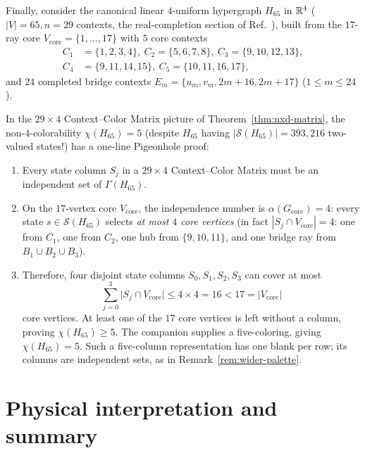 \documentclass[aps,pra,reprint,superscriptaddress,longbibliography,nofootinbib,floatfix,10pt]{revtex4-2}
\theoremstyle{definition}\newtheorem{definition}[theorem]{Definition}
\theoremstyle{remark}\newtheorem{remark}[theorem]{Remark}
\newcommand{\Sc}{\mathcal S}\newcommand{\Cc}{\mathcal C}
\begin{document}
Finally, consider the canonical linear $4$-uniform hypergraph $H_{65}$ in $\mathbb R^4$ ($|V|=65,n=29$ contexts, the real-completion section of Ref.~\cite{svozil2026contexts}), built from the $17$-ray core $V_{\mathrm{core}}=\{1,\ldots,17\}$ with $5$ core contexts
\begin{equation}\label{eq:H65-core}
\begin{aligned}
C_1&=\{1,2,3,4\},\ C_2=\{5,6,7,8\},\ C_3=\{9,10,12,13\},\\
C_4&=\{9,11,14,15\},\ C_5=\{10,11,16,17\},
\end{aligned}
\end{equation}
and $24$ completed bridge contexts $E_m=\{u_m,v_m,2m+16,2m+17\}$ ($1\le m\le 24$).

In the $29\times 4$ Context--Color Matrix picture of Theorem~\ref{thm:nxd-matrix}, the non-4-colorability $\chi(H_{65})=5$ (despite $H_{65}$ having $|\Sc(H_{65})|=393{,}216$ two-valued states!) has a one-line Pigeonhole proof:
\begin{enumerate}
\item Every state column $S_j$ in a $29\times 4$ Context--Color Matrix must be an independent set of $\Gamma(H_{65})$.
\item On the $17$-vertex core $V_{\mathrm{core}}$, the independence number is $\alpha(G_{\mathrm{core}})=4$: every state $s\in\Sc(H_{65})$ selects \emph{at most $4$ core vertices} (in fact $|S_j\cap V_{\mathrm{core}}|=4$: one from $C_1$, one from $C_2$, one hub from $\{9,10,11\}$, and one bridge ray from $B_1\cup B_2\cup B_3$).
\item Therefore, four disjoint state columns $S_0,S_1,S_2,S_3$ can cover at most
\begin{equation}\label{eq:H65-pigeonhole}
\sum_{j=0}^{3}\bigl|S_j\cap V_{\mathrm{core}}\bigr|\le 4\times 4=16 < 17=\bigl|V_{\mathrm{core}}\bigr|
\end{equation}
core vertices. At least one of the $17$ core vertices is left without a column, proving $\chi(H_{65})\ge5$. The companion supplies a five-coloring, giving $\chi(H_{65})=5$. Such a five-column representation has one blank per row; its columns are independent sets, as in Remark~\ref{rem:wider-palette}.
\end{enumerate}




\section{Physical interpretation and summary}\label{sec:conclusion}
\end{document}

